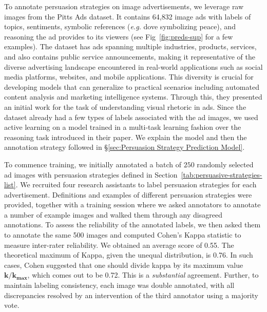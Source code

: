 To annotate persuasion strategies on image advertisements, we leverage raw images from the Pitts Ads dataset. It contains 64,832 image ads with labels of topics, sentiments, symbolic references (\textit{e.g.} dove symbolizing peace), and reasoning the ad provides to its viewers (see Fig~\ref{fig:preds-sup} for a few examples). The dataset has ads spanning multiple industries, products, services, and also contains public service announcements, making it representative of the diverse advertising landscape encountered in real-world applications such as social media platforms, websites, and mobile applications. This diversity is crucial for developing models that can generalize to practical scenarios including automated content analysis and marketing intelligence systems. Through this, they presented an initial work for the task of understanding visual rhetoric in ads. Since the dataset already had a few types of labels associated with the ad images, we used active learning on a model trained in a multi-task learning fashion over the reasoning task introduced in their paper. We explain the model and then the annotation strategy followed in \S\ref{sec:Persuasion Strategy Prediction Model}. 







To commence training, we initially annotated a batch of $250$ randomly selected ad images with persuasion strategies defined in Section~\ref{tab:persuasive-strategies-list}. We recruited four research assistants to label persuasion strategies for each advertisement. Definitions and examples of different persuasion strategies were provided, together with a training session where we asked annotators to annotate a number of example images and walked them through any disagreed annotations. To assess the reliability of the annotated labels, we then asked them to annotate the same 500 images and computed Cohen's Kappa statistic to measure inter-rater reliability. We obtained an average score of 0.55. The theoretical maximum of Kappa, given the unequal distribution, is 0.76. In such cases, Cohen \cite{cohen1960coefficient} suggested that one should divide kappa by its maximum value $\mathbf{k}/\mathbf{k_{max}}$, which comes out to be 0.72. This is a \textit{substantial} agreement. Further, to maintain labeling consistency, each image was double annotated, with all discrepancies resolved by an intervention of the third annotator using a majority vote. 

